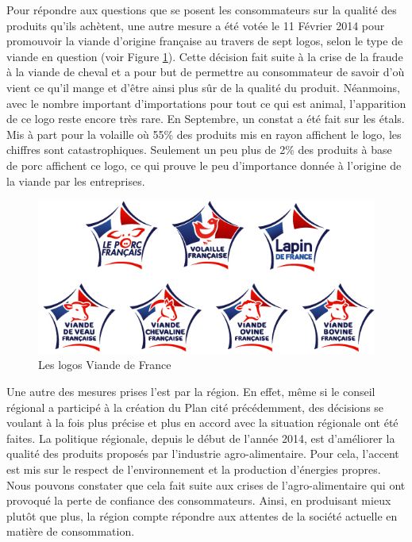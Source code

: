\documentclass[a4paper,12pt]{report}
\begin{document}
			Pour répondre aux questions que se posent les consommateurs sur la qualité des produits qu’ils achètent, une autre mesure a été votée le 11 Février 2014 pour promouvoir la viande d’origine française au travers de sept logos, selon le type de viande en question (voir Figure \ref{VDF}). Cette décision fait suite à la crise de la fraude à la viande de cheval et a pour but de permettre au consommateur de savoir d’où vient ce qu’il mange et d’être ainsi plus sûr de la qualité du produit. Néanmoins, avec le nombre important d’importations pour tout ce qui est animal, l’apparition de ce logo reste encore très rare. En Septembre, un constat a été fait sur les étals. Mis à part pour la volaille où 55\% des produits mis en rayon affichent le logo, les chiffres sont catastrophiques. Seulement un peu plus de 2\% des produits à base de porc affichent ce logo, ce qui prouve le peu d’importance donnée à l’origine de la viande par les entreprises\cite{FlopVDF}.

			\begin{figure}[!h]
			\centering
			\includegraphics[scale=0.5]{Illustrations/VDF.jpg}
			\caption{Les logos Viande de France}
			\label{VDF}
			\end{figure}

			Une autre des mesures prises l’est par la région. En effet, même si le conseil régional a participé à la création du Plan cité précédemment, des décisions se voulant à la fois plus précise et plus en accord avec la situation régionale ont été faites. La politique régionale, depuis le début de l’année 2014, est d’améliorer la qualité des produits proposés par l’industrie agro-alimentaire\cite{FavoriserQualiteAgricultureAgroalimentaire}. Pour cela, l’accent est mis sur le respect de l’environnement et la production d’énergies propres. Nous pouvons constater que cela fait suite aux crises de l’agro-alimentaire qui ont provoqué la perte de confiance des consommateurs. Ainsi, en produisant mieux plutôt que plus, la région compte répondre aux attentes de la société actuelle en matière de consommation.
\end{document}
